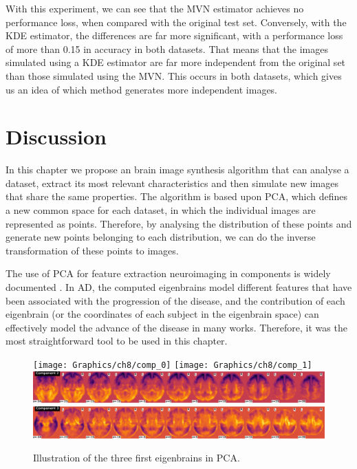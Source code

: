 With this experiment, we can see that the \ac{MVN} estimator achieves no performance loss, when compared with the original test set. Conversely, with the \ac{KDE} estimator, the differences are far more significant, with a performance loss of more than 0.15 in accuracy in both datasets. That means that the images simulated using a \ac{KDE} estimator are far more independent from the original set than those simulated using the \ac{MVN}. This occurs in both datasets, which gives us an idea of which method generates more independent images. 

\section{Discussion}
In this chapter we propose an brain image synthesis algorithm that can analyse a dataset, extract its most relevant characteristics and then simulate new images that share the same properties. The algorithm is based upon \ac{PCA}, which defines a new common space for each dataset, in which the individual images are represented as points. Therefore, by analysing the distribution of these points and generate new points belonging to each distribution, we can do the inverse transformation of these points to images. 

The use of \ac{PCA} for feature extraction neuroimaging in components is widely documented  \cite{Illan2011,Khedher2015,Martinez-Murcia2016book}. In \ac{AD}, the computed eigenbrains model different features that have been associated with the progression of the disease, and the contribution of each eigenbrain (or the coordinates of each subject in the eigenbrain space) can effectively model the advance of the disease in many works. Therefore, it was the most straightforward tool to be used in this chapter.

\begin{figure}[h]
	\centering
	\texttt{[image: Graphics/ch8/comp\_0]}
	\texttt{[image: Graphics/ch8/comp\_1]}
	\includegraphics[width=0.9\linewidth]{Graphics/ch8/comp_2}
	\includegraphics[width=0.9\linewidth]{Graphics/ch8/comp_3}
	\caption{Illustration of the three first eigenbrains in \acs{PCA}.}
	\label{fig:eigenbrainsSyn}
\end{figure}

